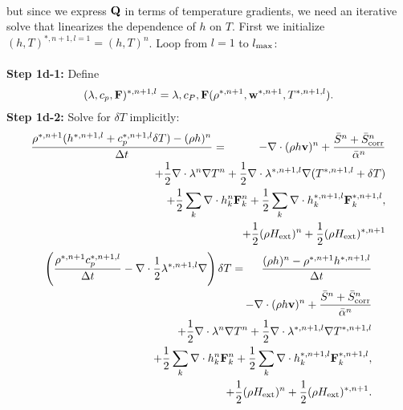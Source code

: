 \documentclass[final]{siamltex}
\def\Fb {{\bf F}}
\def\Qb {{\bf Q}}
\def\vb {{\bf v}}
\def\wb {{\bf w}}
\def\Hext {H_{\rm ext}}
\def\half   {\frac{1}{2}}
\begin{document}
\begin{itemize}
\begin{eqnarray}
\end{eqnarray}
but since we express $\Qb$ in terms of temperature gradients, we need an iterative
solve that linearizes the dependence of $h$ on $T$.  First we initialize
$(h,T)^{*,n+1,l=1} = (h,T)^n$.
Loop from $l=1$ to $l_{\rm max}$:\\ \\
{\bf Step 1d-1:} Define
\begin{equation}
(\lambda,c_p,\Fb)^{*,n+1,l} = \lambda,c_P,\Fb(\rho^{*,n+1},\wb^{*,n+1},T^{*,n+1,l}).
\end{equation}
{\bf Step 1d-2:} Solve for $\delta T$ implicitly:
\begin{eqnarray}
\frac{\rho^{*,n+1}(h^{*,n+1,l} + c_p^{*,n+1,l}\delta T) - (\rho h)^n}{\Delta t} &=&
-\nabla\cdot(\rho h\vb)^n + \frac{\bar{S}^n + \bar{S}_{\rm corr}^n}{\bar{\alpha}^n} \nonumber\\
&&\hspace{-1in} + \half\nabla\cdot\lambda^n\nabla T^n + \half\nabla\cdot\lambda^{*,n+1,l}\nabla(T^{*,n+1,l} + \delta T)\nonumber\\
&&\hspace{-1in} + \half\sum_k\nabla\cdot h_k^n \Fb_k^n + \half\sum_k\nabla\cdot h_k^{*,n+1,l} \Fb_k^{*,n+1,l},\nonumber\\
&&\hspace{-1in} + \half(\rho\Hext)^n + \half(\rho\Hext)^{*,n+1}
\end{eqnarray}
\begin{eqnarray}
\left(\frac{\rho^{*,n+1}c_p^{*,n+1,l}}{\Delta t} - \nabla\cdot\frac{1}{2}\lambda^{*,n+1,l}\nabla\right)\delta T &=& \frac{(\rho h)^n - \rho^{*,n+1}h^{*,n+1,l}}{\Delta t}\nonumber\\
&&\hspace{-1.25in} - \nabla\cdot(\rho h\vb)^n + \frac{\bar{S}^n + \bar{S}_{\rm corr}^n}{\bar{\alpha}^n}\nonumber\\
&&\hspace{-1.25in} + \half\nabla\cdot\lambda^n\nabla T^n + \half\nabla\cdot\lambda^{*,n+1,l}\nabla T^{*,n+1,l}\nonumber\\
&&\hspace{-1.25in} + \half\sum_k\nabla\cdot h_k^n \Fb_k^n + \half\sum_k\nabla\cdot h_k^{*,n+1,l} \Fb_k^{*,n+1,l},\nonumber\\
&&\hspace{-1.25in} + \half(\rho\Hext)^n + \half(\rho\Hext)^{*,n+1}.
\end{eqnarray}


\end{itemize}
\end{document}
